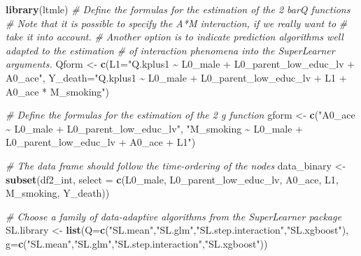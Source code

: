\documentclass[
]{book}
\newenvironment{Shaded}{\begin{snugshade}}{\end{snugshade}}
\newcommand{\AttributeTok}[1]{\textcolor[rgb]{0.13,0.29,0.53}{#1}}
\newcommand{\CommentTok}[1]{\textcolor[rgb]{0.56,0.35,0.01}{\textit{#1}}}
\newcommand{\FunctionTok}[1]{\textcolor[rgb]{0.13,0.29,0.53}{\textbf{#1}}}
\newcommand{\NormalTok}[1]{#1}
\newcommand{\OtherTok}[1]{\textcolor[rgb]{0.56,0.35,0.01}{#1}}
\newcommand{\StringTok}[1]{\textcolor[rgb]{0.31,0.60,0.02}{#1}}
\begin{document}
\begin{Shaded}
\begin{Highlighting}[]
\FunctionTok{library}\NormalTok{(ltmle)}
\CommentTok{\# Define the formulas for the estimation of the 2 barQ functions}
\CommentTok{\# Note that it is possible to specify the A*M interaction, if we really want to}
\CommentTok{\# take it into account.}
\CommentTok{\# Another option is to indicate prediction algorithms well adapted to the estimation}
\CommentTok{\# of interaction phenomena into the SuperLearner arguments.}
\NormalTok{Qform }\OtherTok{\textless{}{-}} \FunctionTok{c}\NormalTok{(}\AttributeTok{L1=}\StringTok{"Q.kplus1 \textasciitilde{} L0\_male + L0\_parent\_low\_educ\_lv + A0\_ace"}\NormalTok{,}
           \AttributeTok{Y\_death=}\StringTok{"Q.kplus1 \textasciitilde{} L0\_male + L0\_parent\_low\_educ\_lv + L1 +}
\StringTok{                    A0\_ace * M\_smoking"}\NormalTok{)}

\CommentTok{\# Define the formulas for the estimation of the 2 g function}
\NormalTok{gform }\OtherTok{\textless{}{-}} \FunctionTok{c}\NormalTok{(}\StringTok{"A0\_ace \textasciitilde{} L0\_male + L0\_parent\_low\_educ\_lv"}\NormalTok{,}
           \StringTok{"M\_smoking \textasciitilde{} L0\_male + L0\_parent\_low\_educ\_lv + A0\_ace + L1"}\NormalTok{)}

\CommentTok{\# The data frame should follow the time{-}ordering of the nodes}
\NormalTok{data\_binary }\OtherTok{\textless{}{-}} \FunctionTok{subset}\NormalTok{(df2\_int, }\AttributeTok{select =} \FunctionTok{c}\NormalTok{(L0\_male, L0\_parent\_low\_educ\_lv,}
\NormalTok{                                          A0\_ace, L1,}
\NormalTok{                                          M\_smoking, Y\_death))}



\CommentTok{\# Choose a family of data{-}adaptive algorithms from the SuperLearner package}
\NormalTok{SL.library }\OtherTok{\textless{}{-}} \FunctionTok{list}\NormalTok{(}\AttributeTok{Q=}\FunctionTok{c}\NormalTok{(}\StringTok{"SL.mean"}\NormalTok{,}\StringTok{"SL.glm"}\NormalTok{,}\StringTok{"SL.step.interaction"}\NormalTok{,}\StringTok{"SL.xgboost"}\NormalTok{),}
                   \AttributeTok{g=}\FunctionTok{c}\NormalTok{(}\StringTok{"SL.mean"}\NormalTok{,}\StringTok{"SL.glm"}\NormalTok{,}\StringTok{"SL.step.interaction"}\NormalTok{,}\StringTok{"SL.xgboost"}\NormalTok{))}



\end{Highlighting}
\end{Shaded}
\end{document}
